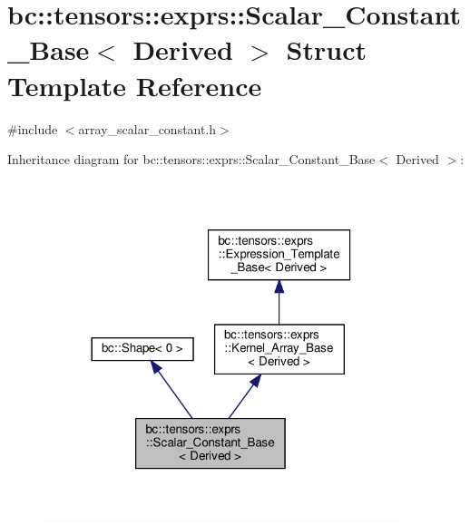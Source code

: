 \hypertarget{structbc_1_1tensors_1_1exprs_1_1Scalar__Constant__Base}{}\section{bc\+:\+:tensors\+:\+:exprs\+:\+:Scalar\+\_\+\+Constant\+\_\+\+Base$<$ Derived $>$ Struct Template Reference}
\label{structbc_1_1tensors_1_1exprs_1_1Scalar__Constant__Base}


{\ttfamily \#include $<$array\+\_\+scalar\+\_\+constant.\+h$>$}



Inheritance diagram for bc\+:\+:tensors\+:\+:exprs\+:\+:Scalar\+\_\+\+Constant\+\_\+\+Base$<$ Derived $>$\+:\nopagebreak
\begin{figure}[H]
\begin{center}
\leavevmode
\includegraphics[width=294pt]{structbc_1_1tensors_1_1exprs_1_1Scalar__Constant__Base__inherit__graph}
\end{center}
\end{figure}


